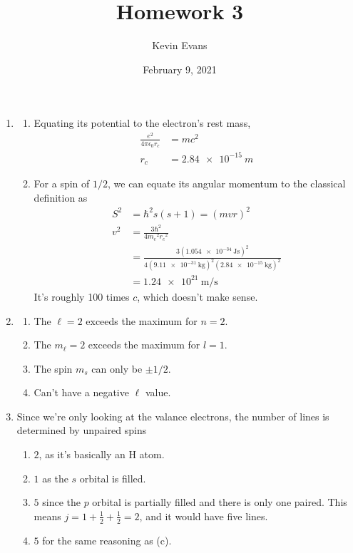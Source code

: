 \documentclass{homework}
\title{Homework 3}
\author{Kevin Evans}
\date{February 9, 2021}
\begin{document}
	\maketitle
	\begin{enumerate}
		\item \begin{enumerate}
			\item Equating its potential to the electron's rest mass, \begin{align*}
				\frac{e^2}{4 \pi \epsilon_0 r_c} & = mc^2 \\
				r_c & = \SI{2.84e-15}{m}
			\end{align*}				
		
			\item For a spin of $1/2$, we can equate its angular momentum to the classical definition as \begin{align*}
				S^2 & = \hbar^2 s (s + 1) = (mvr)^2 \\
				v^2 & = \frac{3\hbar^2 }{4 {m_e}^2 {r_c}^2} \\
					& = \frac{3 \left(\SI{1.054e-34}{\J\s}\right)^2 }{4 \left(\SI{9.11e-31}{\kg}\right)^2 \left(\SI{2.84e-15}{\kg}\right)^2} \\
					& = \SI{1.24e21}{\m\per\s}
			\end{align*}
			It's roughly 100 times $c$, which doesn't make sense.
		\end{enumerate}

		\item \begin{enumerate}
			\item The $\ell=2$ exceeds the maximum for $n=2$.
			\item The $m_\ell=2$ exceeds the maximum for $l=1$.
			\item The spin $m_s$ can only be $\pm 1/2$.
			\item Can't have a negative $\ell$ value.
		\end{enumerate}
	
		\item Since we're only looking at the valance electrons, the number of lines is determined by unpaired spins \begin{enumerate}
			\item $2$, as it's basically an H atom.
			\item $1$ as the $s$ orbital is filled.
			\item $5$ since the $p$ orbital is partially filled and there is only one paired. This means $j=1 + \frac{1}{2} + \frac{1}{2} = 2$, and it would have five lines.
			\item $5$ for the same reasoning as (c).
		\end{enumerate}
		

\end{enumerate}
\end{document}
